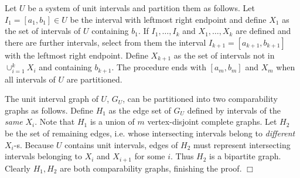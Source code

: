 \documentclass[12pt]{article}
\def\qed{\ifhmode\unskip\nobreak\fi\quad\ifmmode\Box\else$\Box$\fi}
\def\qed{\hfill $\Box$}
\begin{document}
  Let $U$ be a system of unit intervals and partition them as follows.
Let $I_1=[a_1,b_1] \in U$ be the interval with leftmost right endpoint and define $X_1$ as the set of intervals of
$U$ containing $b_1$.
If $I_1,\dots, I_k$ and $X_1,\dots,X_k$ are defined and there are further intervals, select from them the interval $I_{k+1}=[a_{k+1},b_{k+1}]$
with the leftmost right endpoint.
Define $X_{k+1}$ as the set of intervals not in $\cup_{i=1}^k X_i$ and containing $b_{k+1}$.
The procedure ends with $[a_m,b_m]$ and $X_m$ when all intervals of $U$ are partitioned.

The unit interval graph of $U$, $G_U$, can be partitioned into two comparability graphs as follows.
Define $H_1$ as the edge set of $G_U$ defined by intervals of the {\em same}
$X_i$. Note that $H_1$ is a union of $m$ vertex-disjoint complete graphs.
Let $H_2$ be the set of remaining edges, i.e. whose intersecting intervals belong to {\em different}
$X_i$-s.
Because $U$ contains unit intervals,
edges of $H_2$ must represent intersecting intervals belonging to $X_i$ and $X_{i+1}$ for some $i$.
Thus $H_2$ is a bipartite graph. Clearly $H_1,H_2$ are both comparability graphs, finishing the proof.   \qed
\end{document}
